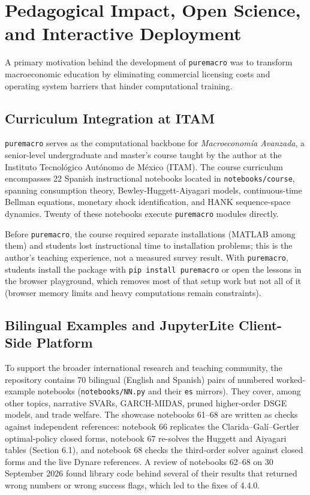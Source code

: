 \documentclass[11pt,letterpaper]{article}
\renewcommand{\_}{\pmunderscore\allowbreak}
\begin{document}
\section{Pedagogical Impact, Open Science, and Interactive Deployment}\label{pedagogical-impact-open-science-and-interactive-deployment}

A primary motivation behind the development of \texttt{puremacro} was to transform macroeconomic education by eliminating commercial licensing costs and operating system barriers that hinder computational training.

\subsection{Curriculum Integration at ITAM}\label{curriculum-integration-at-itam}

\texttt{puremacro} serves as the computational backbone for \emph{Macroeconomía Avanzada}, a senior-level undergraduate and master's course taught by the author at the Instituto Tecnológico Autónomo de México (ITAM). The course curriculum encompasses 22 Spanish instructional notebooks located in \texttt{notebooks/course}, spanning consumption theory, Bewley-Huggett-Aiyagari models, continuous-time Bellman equations, monetary shock identification, and HANK sequence-space dynamics. Twenty of these notebooks execute \texttt{puremacro} modules directly.

Before \texttt{puremacro}, the course required separate installations (MATLAB among them) and students lost instructional time to installation problems; this is the author's teaching experience, not a measured survey result. With \texttt{puremacro}, students install the package with \texttt{pip\ install\ puremacro} or open the lessons in the browser playground, which removes most of that setup work but not all of it (browser memory limits and heavy computations remain constraints).

\subsection{Bilingual Examples and JupyterLite Client-Side Platform}\label{bilingual-examples-and-jupyterlite-client-side-platform}

To support the broader international research and teaching community, the repository contains 70 bilingual (English and Spanish) pairs of numbered worked-example notebooks (\texttt{notebooks/NN\_*.py} and their \texttt{\_es} mirrors). They cover, among other topics, narrative SVARs, GARCH-MIDAS, pruned higher-order DSGE models, and trade welfare. The showcase notebooks 61--68 are written as checks against independent references: notebook 66 replicates the Clarida--Galí--Gertler optimal-policy closed forms, notebook 67 re-solves the Huggett and Aiyagari tables (Section 6.1), and notebook 68 checks the third-order solver against closed forms and the live Dynare references. A review of notebooks 62--68 on 30 September 2026 found library code behind several of their results that returned wrong numbers or wrong success flags, which led to the fixes of 4.4.0.
\end{document}
